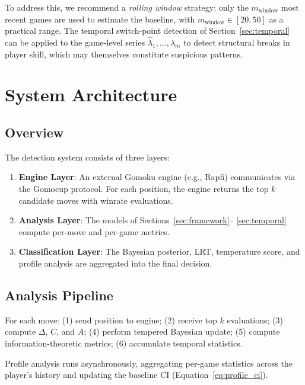 \documentclass[11pt,a4paper]{article}
\begin{document}
To address this, we recommend a \emph{rolling window} strategy: only the
$m_{\text{window}}$ most recent games are used to estimate the baseline,
with $m_{\text{window}} \in [20, 50]$ as a practical range. The temporal
switch-point detection of Section~\ref{sec:temporal} can be applied to the
game-level series $\hat{\lambda}_1, \ldots, \hat{\lambda}_m$ to detect
structural breaks in player skill, which may themselves constitute
suspicious patterns.


\section{System Architecture}
\label{sec:architecture}

\subsection{Overview}

The detection system consists of three layers:
\begin{enumerate}
    \item \textbf{Engine Layer}: An external Gomoku engine (e.g., Rapfi)
          communicates via the Gomocup protocol. For each position, the engine
          returns the top $k$ candidate moves with winrate evaluations.
    \item \textbf{Analysis Layer}: The models of Sections~\ref{sec:framework}--
          \ref{sec:temporal} compute per-move and per-game metrics.
    \item \textbf{Classification Layer}: The Bayesian posterior, LRT, temperature
          score, and profile analysis are aggregated into the final decision.
\end{enumerate}

\subsection{Analysis Pipeline}

For each move: (1) send position to engine; (2) receive top $k$ evaluations;
(3) compute $\Delta$, $C$, and $A$; (4) perform tempered Bayesian update;
(5) compute information-theoretic metrics; (6) accumulate temporal statistics.

Profile analysis runs asynchronously, aggregating per-game statistics across
the player's history and updating the baseline CI (Equation~\eqref{eq:profile_ci}).
\end{document}
